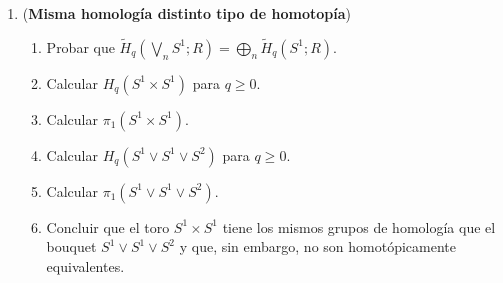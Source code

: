 \documentclass[11pt,a4paper]{article}
\theoremstyle{plain}
\theoremstyle{definition}
\theoremstyle{remark}
\newcommand{\CC}{\mathbb C}
\begin{document}
\begin{enumerate}[label=\arabic*.,leftmargin=*]
\begin{enumerate}[label=\alph*)]
\[\begin{aligned}
\end{aligned}
\]
Definimos la inversa de $F$ como
\[
F':\CC P^{n-1}-\CC P^n\to D^{2n}-S^{2n-1},
\]
\[
[z_1,\dots,z_{n+1}]\mapsto\frac{1}{a_{n+1}}\Big(\Re(z_1\overline{z_{n+1}}),\Im(z_1\overline{z_{n+1}}),\dots,\Re(z_n\overline{z_{n+1}}),\Im(z_n\overline{z_{n+1}})\Big)
\]
donde $a_{n+1}=|z_{n+1}|\sqrt{\sum_{i=1}^{n+1}|z_i|^2}$. Así,
$\CC P^n\cong\CC P^{n-1}\cup_{F|_{S^{2n-1}}}D^{2n}$.
\item Consideremos el diagrama
\[
\begin{tikzcd}
X \arrow[r] \arrow[d,swap,"F"] & F(A)\cup_{F|_A}X \\
X/\!\sim \arrow[ur] &
\end{tikzcd}
\]
Notemos que $p|_X$ es sobreyectivo ya que $p$ identifica $a\sim F(a)$ y
$a\in X$. Supongamos que, dados $a,a'\in X$, $p|_X(a)=p|_X(a')$; entonces
$a=a'$ y así $F(a)=F(a')$.

Supongamos que $F(a)=F(a')$. Como $pF(a)=p(a)$ y $pF(a')=p(a')$, entonces
$p(a)=p(a')$. Por lo tanto, las identificaciones $p|_X$ y $F$ son
compatibles (identifican el mismo subespacio).
\end{enumerate}

\item (\textbf{Misma homología distinto tipo de homotopía})
\begin{enumerate}[label=\alph*)]
\item Probar que $\tilde H_q\left(\bigvee_nS^1;R\right)=\bigoplus_n\tilde H_q(S^1;R)$.
\item Calcular $H_q(S^1\times S^1)$ para $q\ge0$.
\item Calcular $\pi_1(S^1\times S^1)$.
\item Calcular $H_q(S^1\vee S^1\vee S^2)$ para $q\ge0$.
\item Calcular $\pi_1(S^1\vee S^1\vee S^2)$.
\item Concluir que el toro $S^1\times S^1$ tiene los mismos grupos de
homología que el bouquet $S^1\vee S^1\vee S^2$ y que, sin embargo, no son
homotópicamente equivalentes.
\end{enumerate}


\end{enumerate}
\end{document}

